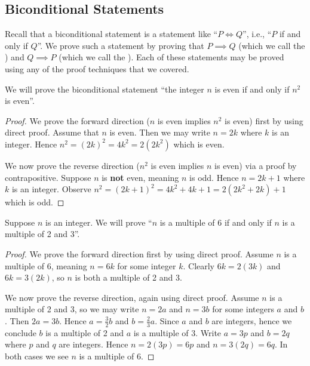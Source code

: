 \subsection{Biconditional Statements}
Recall that a biconditional statement is a statement like ``$P \iff Q$'', i.e., ``$P$ if and only if $Q$''. We prove such a statement by proving that $P \implies Q$ (which we call the ) and $Q \implies P$ (which we call the ). Each of these statements may be proved using any of the proof techniques that we covered.
\begin{example}
    We will prove the biconditional statement ``the integer $n$ is even if and only if $n^2$ is even''.
    \begin{proof}
        We prove the forward direction ($n$ is even implies $n^2$ is even) first by using direct proof. Assume that $n$ is even. Then we may write $n = 2k$ where $k$ is an integer. Hence $n^2 = (2k)^2 = 4k^2 = 2(2k^2)$ which is even.

        We now prove the reverse direction ($n^2$ is even implies $n$ is even) via a proof by contrapositive. Suppose $n$ is \textbf{not} even, meaning $n$ is odd. Hence $n = 2k + 1$ where $k$ is an integer. Observe $n^2 = (2k+1)^2 = 4k^2 + 4k + 1 = 2(2k^2 + 2k) + 1$ which is odd.
    \end{proof}
\end{example}

\begin{example}
    Suppose $n$ is an integer. We will prove ``$n$ is a multiple of 6 if and only if $n$ is a multiple of 2 and 3''.
    \begin{proof}
        We prove the forward direction first by using direct proof. Assume $n$ is a multiple of 6, meaning $n = 6k$ for some integer $k$. Clearly $6k = 2(3k)$ and $6k = 3(2k)$, so $n$ is both a multiple of 2 and 3.

        We now prove the reverse direction, again using direct proof. Assume $n$ is a multiple of 2 and 3, so we may write $n = 2a$ and $n = 3b$ for some integers $a$ and $b$. Then $2a = 3b$. Hence $a = \frac 32 b$ and $b = \frac 23 a$. Since $a$ and $b$ are integers, hence we conclude $b$ is a multiple of 2 and $a$ is a multiple of 3. Write $a = 3p$ and $b = 2q$ where $p$ and $q$ are integers. Hence $n = 2(3p) = 6p$ and $n = 3(2q) = 6q$. In both cases we see $n$ is a multiple of 6.
    \end{proof}
\end{example}


